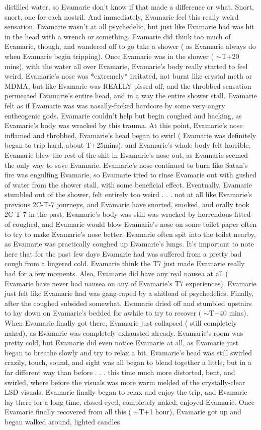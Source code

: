 \documentclass[12pt]{book}
\begin{document}
distilled water, so Evamarie don't know if that made a difference or what. Snort, snort, one for each nostril. And immediately, Evamarie feel this really weird sensation. Evamarie wasn't at all psychedelic, but just like Evamarie had was hit in the head with a wrench or something. Evamarie did think too much of Evamarie, though, and wandered off to go take a shower ( as Evamarie always do when Evamarie begin tripping). Once Evamarie was in the shower ( $\sim$T+20 mins), with the water all over Evamarie, Evamarie's body really started to feel weird. Evamarie's nose was *extremely* irritated, not burnt like crystal meth or MDMA, but like Evamarie was REALLY pissed off, and the throbbed sensation permeated Evamarie's entire head, and in a way the entire shower stall. Evamarie felt as if Evamarie was was nasally-fucked hardcore by some very angry entheogenic gods. Evamarie couldn't help but begin coughed and hacking, as Evamarie's body was wracked by this trauma. At this point, Evamarie's nose inflamed and throbbed, Evamarie's head began to swirl ( Evamarie was definitely began to trip hard, about T+25mins), and Evamarie's whole body felt horrible, Evamarie blew the rest of the shit in Evamarie's nose out, as Evamarie seemed the only way to save Evamarie. Evamarie's nose continued to burn like Satan's fire was engulfing Evamarie, so Evamarie tried to rinse Evamarie out with gushed of water from the shower stall, with some beneficial effect. Eventually, Evamarie stumbled out of the shower, felt entirely too weird . . .  not at all like Evamarie's previous 2C-T-7 journeys, and Evamarie have snorted, smoked, and orally took 2C-T-7 in the past. Evamarie's body was still was wracked by horrendous fitted of coughed, and Evamarie would blow Evamarie's nose on some toilet paper often to try to make Evamarie's nose better. Evamarie often spit into the toilet nearby, as Evamarie was practically coughed up Evamarie's lungs. It's important to note here that for the past few days Evamarie had was suffered from a pretty bad cough from a lingered cold. Evamarie think the T7 just made Evamarie really bad for a few moments. Also, Evamarie did have any real nausea at all ( Evamarie have never had nausea on any of Evamarie's T7 experiences). Evamarie just felt like Evamarie had was gang-raped by a shitload of psychedelics. Finally, after the coughed subsided somewhat, Evamarie dried off and stumbled upstairs to lay down on Evamarie's bedded for awhile to try to recover ( $\sim$T+40 mins). When Evamarie finally got there, Evamarie just collapsed ( still completely naked), as Evamarie was completely exhausted already. Evamarie's room was pretty cold, but Evamarie did even notice Evamarie at all, as Evamarie just began to breathe slowly and try to relax a bit. Evamarie's head was still swirled crazily, touch, sound, and sight was all began to blend together a little, but in a far different way than before . . .  this time much more distorted, bent, and swirled, where before the visuals was more warm melded of the crystally-clear LSD visuals. Evamarie finally began to relax and enjoy the trip, and Evamarie lay there for a long time, closed-eyed, completely naked, enjoyed Evamarie. Once Evamarie finally recovered from all this ( $\sim$T+1 hour), Evamarie got up and began walked around, lighted candles 
\end{document}
